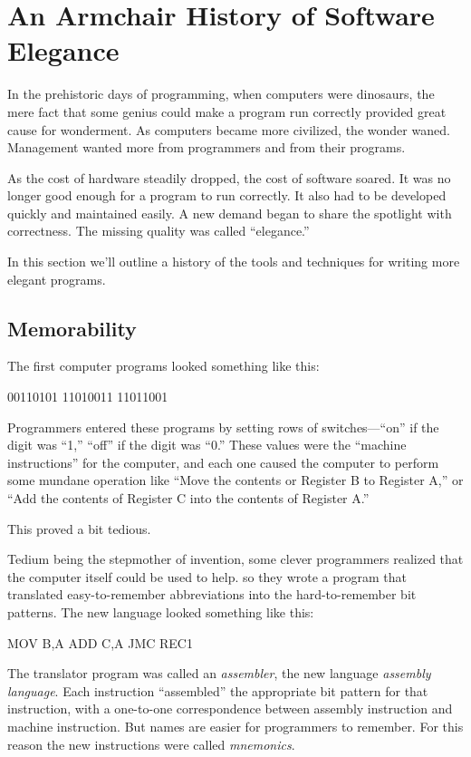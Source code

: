 \section{An Armchair History of Software Elegance}

In the prehistoric days of programming, when computers were dinosaurs,
the mere fact that some genius could make a program run correctly
provided great cause for wonderment. As computers became more
civilized, the wonder waned. Management wanted more from programmers
and from their programs.

As the cost of hardware steadily dropped, the cost of software soared.
It was no longer good enough for a program to run correctly. It also
had to be developed quickly and maintained easily. A new demand began
to share the spotlight with correctness.  The missing quality was
called ``elegance.''

In this section we'll outline a history of the tools and techniques
for writing more elegant programs.

\subsection{Memorability}
The first computer programs looked something like this:%
\begin{Code}
00110101
11010011
11011001
\end{Code}
Programmers entered these programs by setting rows of
switches---``on'' if the digit was ``1,'' ``off'' if the digit was ``0.''
These values were the ``machine instructions'' for the computer, and
each one caused the computer to perform some mundane operation like
``Move the contents or Register B to Register A,'' or ``Add the
contents of Register C into the contents of Register A.''

This proved a bit tedious.

Tedium being the stepmother of invention, some clever programmers
realized that the computer itself could be used to help.  so they
wrote a program that translated easy-to-remember
abbreviations into the hard-to-remember bit
patterns. The new language looked something like this:
\begin{Code}
MOV B,A
ADD C,A
JMC REC1
\end{Code}
The translator program was called an
\emph{assembler},
the new language
\emph{assembly language}.
Each instruction ``assembled'' the appropriate bit pattern for that
instruction, with a one-to-one correspondence between assembly
instruction and machine instruction.  But names are easier for
programmers to remember. For this reason the new instructions were called
\emph{mnemonics}.%


